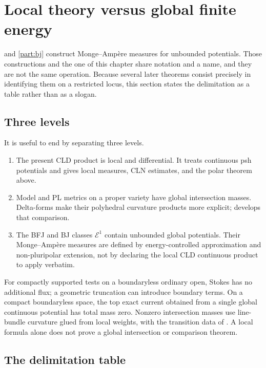 \section{Local theory versus global finite energy}
\label{sec:ch16-local-vs-global}

 and \cref{part:bj} construct Monge--Amp\`ere measures for
unbounded potentials.  Those constructions and the one of this chapter share
notation and a name, and they are not the same operation.  Because several
later theorems consist precisely in identifying them on a restricted locus,
this section states the delimitation as a table rather than as a slogan.

\subsection{Three levels}
\label{sec:ch16-three-levels}

It is useful to end by separating three levels.
\begin{enumerate}
\item The present CLD product is local and differential.  It treats
continuous psh potentials and gives local measures, CLN estimates, and the
polar theorem above.
\item Model and PL metrics on a proper variety have global intersection
masses.  Delta-forms make their polyhedral curvature products more explicit;
 develops that comparison.
\item The BFJ and BJ classes $\mathcal E^1$ contain unbounded global
potentials.  Their Monge--Amp\`ere measures are defined by energy-controlled
approximation and non-pluripolar extension, not by declaring the local CLD
continuous product to apply verbatim.
\end{enumerate}
For compactly supported tests on a boundaryless ordinary open,
Stokes has no additional flux; a geometric truncation can introduce boundary
terms.  On a compact boundaryless space, the top exact current obtained from
a single global continuous potential has total mass zero.  Nonzero
intersection masses use line-bundle curvature glued from local weights,
with the transition data of .  A local
formula alone does not prove a global intersection or comparison theorem.

\subsection{The delimitation table}
\label{sec:ch16-delimitation-table}

